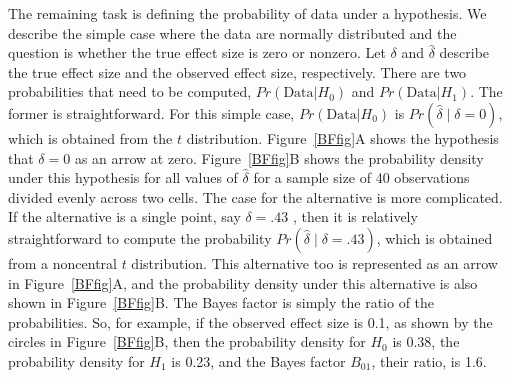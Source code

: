 \documentclass[man]{apa6}
\begin{document}
The remaining task is defining the probability of data under a hypothesis.  We describe the simple case where the data are normally distributed and the question is whether the true effect size is zero or nonzero.  Let $\delta$ and $\hat{\delta}$ describe the true effect size and the observed effect size, respectively.  There are two probabilities that need to be computed,   $Pr(\mbox{Data} | H_0)$ and $Pr(\mbox{Data} | H_1)$.   The former is straightforward.  For this simple case, $Pr(\mbox{Data} | H_0)$ is $Pr(\hat{\delta} \mid \delta=0)$, which is obtained from the $t$ distribution.  Figure~\ref{BFfig}A shows the hypothesis that $\delta=0$ as an arrow at zero.  Figure~\ref{BFfig}B shows the probability density under this hypothesis for all values of $\hat{\delta}$ for a sample size of 40 observations divided evenly across two cells. The case for the alternative is more complicated.  If the alternative is a single point, say $\delta=.43$ \citep[here chosen as an example because $\delta = 0.43$ is the effect size of violent games on aggressive behaviors as described by][]{Anderson:etal:2010}, then it is relatively straightforward to compute the probability $Pr(\hat{\delta} \mid \delta=.43)$, which is obtained from a noncentral $t$ distribution.   This alternative too is represented as an arrow in Figure~\ref{BFfig}A, and the probability density under this alternative is also shown in Figure~\ref{BFfig}B. The Bayes factor is simply the ratio of the probabilities.  So, for example, if the observed effect size is 0.1, as shown by the circles in Figure~\ref{BFfig}B, then the probability density for $H_0$ is 0.38, the probability density for $H_1$ is 0.23, and the Bayes factor $B_{01}$, their ratio, is 1.6. 
\end{document}
